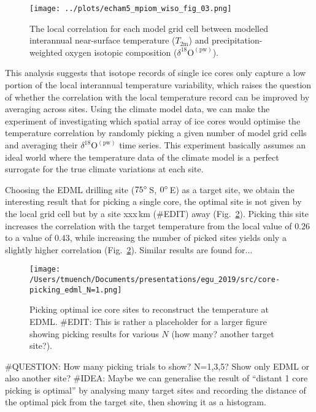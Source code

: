 \documentclass[cp, manuscript]{copernicus}
\begin{document}
\begin{figure}[t]%
\centering
\texttt{[image: ../plots/echam5\_mpiom\_wiso\_fig\_03.png]}
\caption[Average decorrelation lengths]{%
  The local correlation for each model grid cell between modelled interannual
  near-surface temperature ($T_{2\mathrm{m}}$) and precipitation-weighted oxygen
  isotopic composition ($\delta^{18}\mathrm{O}^{\mathrm{(pw)}}$).}
\label{fig:local.cor}%
\end{figure}%

This analysis suggests that isotope records of single ice cores only
capture a low portion of the local interannual temperature variability, which
raises the question of whether the correlation with the local temperature record
can be  improved by averaging across sites. Using the climate model data, we can
make the experiment of investigating which spatial array of ice cores would
optimise the temperature correlation by randomly picking a given number of model
grid cells and averaging their $\delta^{18}\mathrm{O}^{\mathrm{(pw)}}$ time
series. This experiment basically assumes an ideal world where the temperature
data of the climate model is a perfect surrogate for the true climate
variations at each site.

Choosing the EDML drilling site ($75^{\circ}$\,S, $0^{\circ}$\,E) as a target
site, we obtain the interesting result that for picking a single core, the
optimal site is not given by the local grid cell but by a site xxx\,km (\#EDIT)
away (Fig.~\ref{fig:picking}). Picking this site increases the correlation with the target
temperature from the local value of $0.26$ to a value of $0.43$, while
increasing the number of picked sites yields only a slightly higher correlation
(Fig.~\ref{fig:picking}). Similar results are found for...

\begin{figure}[t]%
\centering
\texttt{[image: /Users/tmuench/Documents/presentations/egu\_2019/src/core-picking\_edml\_N=1.png]}
\caption[Optimal site picking]{%
  Picking optimal ice core sites to reconstruct the temperature at EDML. \#EDIT:
  This is rather a placeholder for a larger figure showing picking results for
  various $N$ (how many? another target site?).}
\label{fig:picking}%
\end{figure}%

\#QUESTION: How many picking trials to show? N=1,3,5? Show only EDML or also
another site?
\#IDEA: Maybe we can generalise the result of ``distant 1 core picking is
optimal'' by analysing many target sites and recording the distance of the
optimal pick from the target site, then showing it as a histogram.
\end{document}
